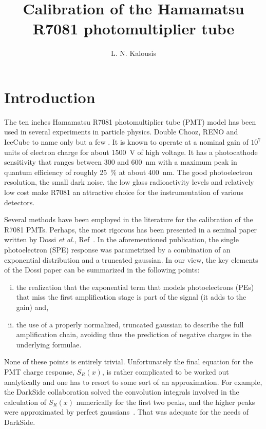 \documentclass[a4paper,11pt]{article}
\title{\boldmath Calibration of the Hamamatsu R7081 photomultiplier tube}
\author[a]{L. N. Kalousis}
\affiliation[a]{Physics Department, National Technical University, 157 80 Zografou, Athens, Greece}
\begin{document}
\maketitle
\flushbottom

\section{Introduction}
\label{sec:intro}

The ten inches Hamamatsu R7081 photomultiplier tube (PMT) model has been used in several experiments in particle physics. 
Double Chooz, RENO and IceCube to name only but a few \cite{dc,reno,icecube}.
It is known to operate at a nominal gain of $10^7$ units of electron charge for about 1500~V of high voltage. 
It has a photocathode sensitivity that ranges between 300 and 600~nm with a maximum peak in quantum efficiency of roughly 25~$\%$ at about 400~nm. 
The good photoelectron resolution, the small dark noise, the low glass radioactivity levels and relatively low cost make R7081 an attractive choice for the instrumentation of various detectors. 

Several methods have been employed in the literature for the calibration of the R7081 PMTs. 
Perhaps, the most rigorous has been presented in a seminal paper written by Dossi \emph{et al.}, Ref~\cite{dossi}. 
In the aforementioned publication, the single photoelectron (SPE) response was parametrized by a combination of an exponential distribution and a truncated gaussian. 
In our view, the key elements of the Dossi paper can be summarized in the following points:
\begin{enumerate}[i.]
\item the realization that the exponential term that models photoelectrons (PEs) that miss the first amplification stage is part of the signal (it adds to the gain) and,
\item the use of a properly normalized, truncated gaussian to describe the full amplification chain, avoiding thus the prediction of negative charges in the underlying formulae. 
\end{enumerate}
None of these points is entirely trivial. 
Unfortunately the final equation for the PMT charge response, $S_R(x)$, is rather complicated to be worked out analytically and one has to resort to some sort of an approximation. %
For example, the DarkSide collaboration solved the convolution integrals involved in the calculation of $S_R(x)$ numerically for the first two peaks, and the higher peaks were approximated by perfect gaussians~\cite{darkside}. 
That was adequate for the needs of DarkSide. 
\end{document}
